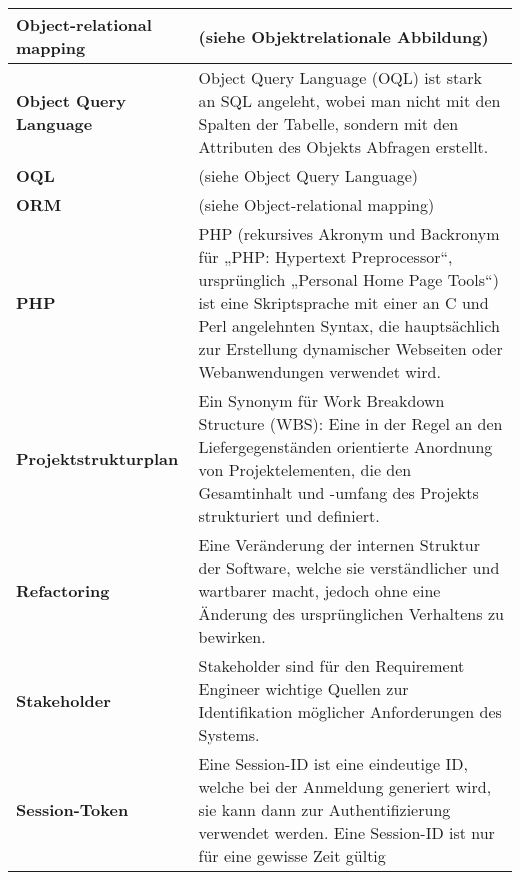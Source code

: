 \begin{longtable}{|m{3cm}|m{11cm}|}
	\textbf{Object-relational mapping}&
	(siehe Objektrelationale Abbildung)\\ \hline	

	\textbf{Object Query Language}&
	Object Query Language (OQL) ist stark an SQL angeleht, wobei man nicht mit den Spalten der Tabelle, sondern mit den Attributen des Objekts Abfragen erstellt.\\ \hline	

	\textbf{OQL}&
	(siehe Object Query Language)\\ \hline

	\textbf{ORM}&
	(siehe Object-relational mapping)\\ \hline

	\textbf{PHP}&
	PHP (rekursives Akronym und Backronym für „PHP: Hypertext Preprocessor“, ursprünglich „Personal Home Page Tools“) ist eine Skriptsprache mit einer an C und Perl angelehnten Syntax, die hauptsächlich zur Erstellung dynamischer Webseiten oder Webanwendungen verwendet wird.\cite{wiki_php}\\ \hline	

	\textbf{Projektstrukturplan}&
	Ein Synonym für Work Breakdown Structure (WBS): Eine in der Regel an den Liefergegenständen orientierte Anordnung von Projektelementen, die den Gesamtinhalt und -umfang des Projekts strukturiert und definiert.\cite{proj_mgmt_book}\\ \hline	

	\textbf{Refactoring}&
	Eine Veränderung der internen Struktur der Software, welche sie verständlicher und wartbarer macht, jedoch ohne eine Änderung des ursprünglichen Verhaltens zu bewirken.\cite{feathers2004working}\\ \hline

	\textbf{Stakeholder}&
	Stakeholder sind für den Requirement Engineer wichtige Quellen zur Identifikation möglicher Anforderungen des Systems.\cite{req_eng_book}\\ \hline		

	\textbf{Session-Token}&
	Eine Session-ID ist eine eindeutige ID, welche bei der Anmeldung generiert wird, sie kann dann zur Authentifizierung verwendet werden. Eine Session-ID ist nur für eine gewisse Zeit gültig \\ \hline

\end{longtable}
